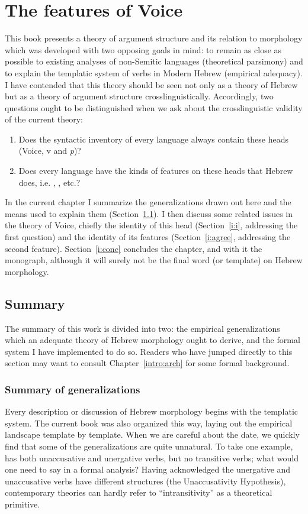 \chapter{The features of Voice}
\label{chap:i}

This book presents a theory of argument structure and its relation to morphology which was developed with two opposing goals in mind: to remain as close as possible to existing analyses of non-Semitic languages (theoretical parsimony) and to explain the templatic system of verbs in Modern Hebrew (empirical adequacy). I have contended that this theory should be seen not only as a theory of Hebrew but as a theory of argument structure crosslinguistically. Accordingly, two questions ought to be distinguished when we ask about the crosslinguistic validity of the current theory:
\begin{enumerate}
	\item Does the syntactic inventory of every language always contain these heads (Voice, v and \emph{p})?
	\item Does every language have the kinds of features on these heads that Hebrew does, i.e. {\vd}, \pz, etc.?
\end{enumerate}

In the current chapter I summarize the generalizations drawn out here and the means used to explain them (Section~\ref{i:sum}). I then discuss some related issues in the theory of Voice, chiefly the identity of this head (Section~\ref{i:i}, addressing the first question) and the identity of its features (Section~\ref{i:agree}, addressing the second feature). Section~\ref{i:conc} concludes the chapter, and with it the monograph, although it will surely not be the final word (or template) on Hebrew morphology.


\section{Summary} \label{i:sum}
The summary of this work is divided into two: the empirical generalizations which an adequate theory of Hebrew morphology ought to derive, and the formal system I have implemented to do so. Readers who have jumped directly to this section may want to consult Chapter~\ref{intro:arch} for some formal background.

	\subsection{Summary of generalizations}
Every description or discussion of Hebrew morphology begins with the templatic system. The current book was also organized this way, laying out the empirical landscape template by template. When we are careful about the date, we quickly find that some of the generalizations are quite unnatural. To take one example, {\tnif} has both unaccusative and unergative verbs, but no transitive verbs; what would one need to say in a formal analysis? Having acknowledged the unergative and unaccusative verbs have different structures (the Unaccusativity Hypothesis), contemporary theories can hardly refer to ``intransitivity'' as a theoretical primitive.

